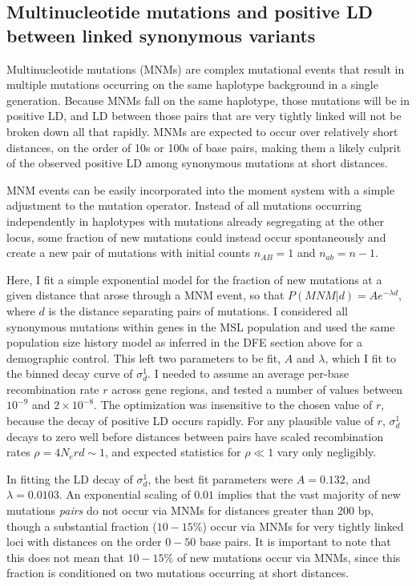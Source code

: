 \documentclass[]{article}
\begin{document}
\subsection{Multinucleotide mutations and positive LD between linked synonymous variants}\label{multinucleotide-mutations-and-positive-ld-between-linked-synonymous-variants}

Multinucleotide mutations (MNMs) are complex mutational events that result in
multiple mutations occurring on the same haplotype background in a single
generation. Because MNMs fall on the same haplotype, those mutations will be in
positive LD, and LD between those pairs that are very tightly linked will not
be broken down all that rapidly. MNMs are expected to occur over relatively
short distances, on the order of 10s or 100s of base pairs, making them a
likely culprit of the observed positive LD among synonymous mutations at short
distances.

MNM events can be easily incorporated into the moment system with a simple
adjustment to the mutation operator. Instead of all mutations occurring
independently in haplotypes with mutations already segregating at the other
locus, some fraction of new mutations could instead occur spontaneously and
create a new pair of mutations with initial counts \(n_{AB} = 1\) and \(n_{ab} = n-1\).

Here, I fit a simple exponential model for the fraction of new mutations at a
given distance that arose through a MNM event, so that \(P(MNM | d) = Ae^{-\lambda d}\), where \(d\) is the distance separating pairs of mutations. I
considered all synonymous mutations within genes in the MSL population and used
the same population size history model as inferred in the DFE section above for
a demographic control. This left two parameters to be fit, \(A\) and \(\lambda\),
which I fit to the binned decay curve of \(\sigma_d^1\). I needed to assume an
average per-base recombination rate \(r\) across gene regions, and tested a
number of values between \(10^{-9}\) and \(2\times 10^{-8}\). The optimization was
insensitive to the chosen value of \(r\), because the decay of positive LD occurs
rapidly. For any plausible value of \(r\), \(\sigma_d^1\) decays to zero well
before distances between pairs have scaled recombination rates \(\rho=4 N_e r d \sim 1\), and expected statistics for \(\rho \ll 1\) vary only negligibly.

In fitting the LD decay of \(\sigma_d^1\), the best fit parameters were
\(A=0.132\), and \(\lambda=0.0103\). An exponential scaling of \(0.01\) implies that
the vast majority of new mutations \emph{pairs} do not occur via MNMs for distances
greater than 200 bp, though a substantial fraction (\(10-15\%\)) occur via MNMs
for very tightly linked loci with distances on the order \(0-50\) base pairs. It
is important to note that this does not mean that \(10-15\%\) of new mutations
occur via MNMs, since this fraction is conditioned on two mutations occurring
at short distances.
\end{document}
